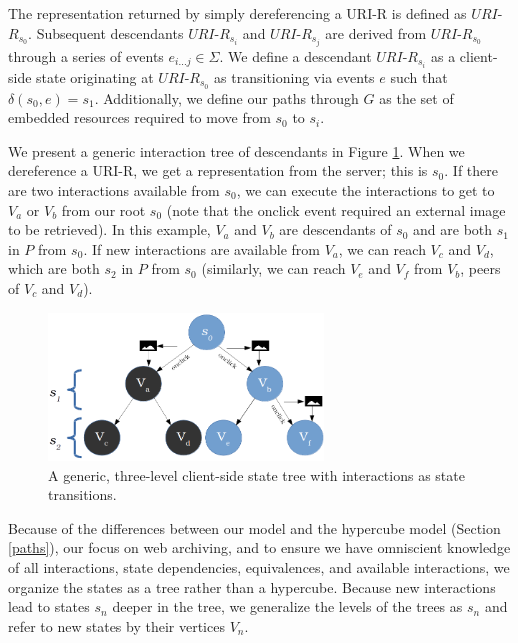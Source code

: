 \documentclass{sig-alternate}
\begin{document}
The representation returned by simply dereferencing a URI-R is defined as $URI$-$R_{s_0}$. Subsequent descendants $URI$-$R_{s_i}$ and $URI$-$R_{s_j}$ are derived from $URI$-$R_{s_0}$ through a series of events $e_{i...j} \in \Sigma$. We define a descendant $URI$-$R_{s_i}$ as a client-side state originating at $URI$-$R_{s_0}$ as transitioning via events $e$ such that $\delta(s_0, e) = s_1$. Additionally, we define our paths through $G$ as the set of embedded resources required to move from $s_0$ to $s_i$.

We present a generic interaction tree of descendants in Figure \ref{diagram}. When we dereference a URI-R, we get a representation from the server; this is $s_0$. If there are two interactions available from $s_0$, we can execute the interactions to get to $V_a$ or $V_b$ from our root $s_0$ (note that the onclick event required an external image to be retrieved). In this example, $V_a$ and $V_b$ are descendants of $s_0$ and are both $s_1$ in $P$ from $s_0$. If new interactions are available from $V_a$, we can reach $V_c$ and $V_d$, which are both $s_2$ in $P$ from $s_0$ (similarly, we can reach $V_e$ and $V_f$ from $V_b$, peers of $V_c$ and $V_d$). 


\begin{figure}[hT]
\centering
    \includegraphics[width=0.65\textwidth]{./imgs/state_diagram_www.png}
  \caption{A generic, three-level client-side state tree with interactions as state transitions.}
\label{diagram}
\end{figure}

Because of the differences between our model and the hypercube model (Section \ref{paths}), our focus on web archiving, and to ensure we have omniscient knowledge of all interactions, state dependencies, equivalences, and available interactions, we organize the states as a tree rather than a hypercube. Because new interactions lead to states $s_n$ deeper in the tree, we generalize the levels of the trees as $s_n$ and refer to new states by their vertices $V_n$.


\end{document}
